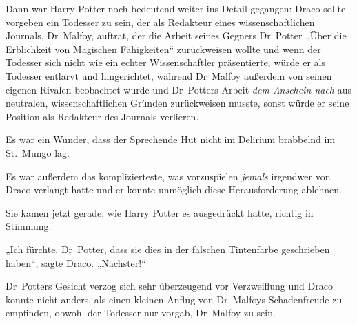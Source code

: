 Dann war Harry Potter noch bedeutend weiter ins Detail gegangen: Draco sollte vorgeben ein Todesser zu sein, der als Redakteur eines wissenschaftlichen Journals, Dr~Malfoy, auftrat, der die Arbeit seines Gegners Dr~Potter „Über die Erblichkeit von Magischen Fähigkeiten“ zurückweisen wollte und wenn der Todesser sich nicht wie ein echter Wissenschaftler präsentierte, würde er als Todesser entlarvt und hingerichtet, während Dr~Malfoy außerdem von seinen eigenen Rivalen beobachtet wurde und Dr~Potters Arbeit \emph{dem Anschein nach} aus neutralen, wissenschaftlichen Gründen zurückweisen musste, sonst würde er seine Position als Redakteur des Journals verlieren.

Es war ein Wunder, dass der Sprechende Hut nicht im Delirium brabbelnd im St.~Mungo lag.

Es war außerdem das komplizierteste, was vorzuspielen \emph{jemals} irgendwer von Draco verlangt hatte und er konnte unmöglich diese Herausforderung ablehnen.

Sie kamen jetzt gerade, wie Harry Potter es ausgedrückt hatte, richtig in Stimmung.

„Ich fürchte, Dr~Potter, dass sie dies in der falschen Tintenfarbe geschrieben haben“, sagte Draco.
„Nächster!“

Dr~Potters Gesicht verzog sich sehr überzeugend vor Verzweiflung und Draco konnte nicht anders, als einen kleinen Anflug von Dr~Malfoys Schadenfreude zu empfinden, obwohl der Todesser nur vorgab, Dr~Malfoy zu sein.

